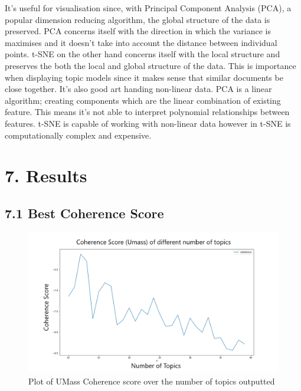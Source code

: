 \documentclass[
]{article}
\begin{document}
It's useful for visualisation since, with Principal Component Analysis
(PCA), a popular dimension reducing algorithm, the global structure of
the data is preserved. PCA concerns itself with the direction in which
the variance is maximises and it doesn't take into account the distance
between individual points. t-SNE on the other hand concerns itself with
the local structure and preserves the both the local and global
structure of the data. This is importance when displaying topic models
since it makes sense that similar documents be close together. It's also
good art handing non-linear data. PCA is a linear algorithm; creating
components which are the linear combination of existing feature. This
means it's not able to interpret polynomial relationships between
features. t-SNE is capable of working with non-linear data however in
t-SNE is computationally complex and expensive.

\hypertarget{results}{%
\section{7. Results}\label{results}}

\hypertarget{best-coherence-score}{%
\subsection{7.1 Best Coherence Score}\label{best-coherence-score}}

\begin{figure}

{\centering \includegraphics[width=1\linewidth]{images/Best_coherenceU_mass} 

}

\caption{Plot of UMass Coherence score over the number of topics outputted}\label{fig:cohumass}
\end{figure}
\end{document}
